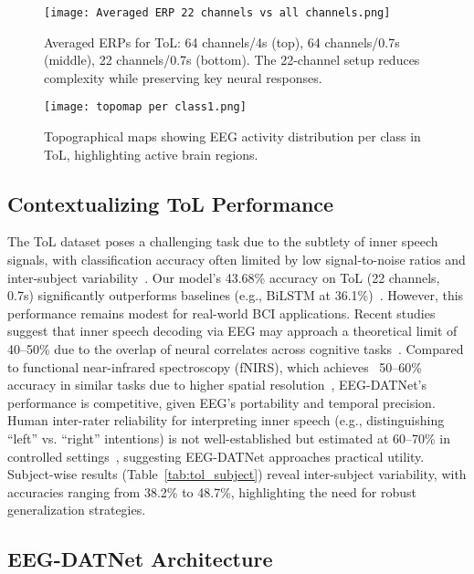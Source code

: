 \documentclass[pdflatex,sn-mathphys-num]{sn-jnl}%
\theoremstyle{thmstyleone}
\theoremstyle{thmstyletwo}
\theoremstyle{thmstylethree}
\begin{document}
\begin{figure}[H]
    \centering
    \texttt{[image: Averaged ERP 22 channels vs all channels.png]}
    \caption{Averaged ERPs for ToL: 64 channels/4s (top), 64 channels/0.7s (middle), 22 channels/0.7s (bottom). The 22-channel setup reduces complexity while preserving key neural responses.}
    \label{fig:Averaged ERP 22 channels vs all channels}
\end{figure}

\begin{figure}[H]
    \centering
    \texttt{[image: topomap per class1.png]}
    \caption{Topographical maps showing EEG activity distribution per class in ToL, highlighting active brain regions.}
    \label{fig:topomap per class}
\end{figure}

\subsection{Contextualizing ToL Performance}\label{subsec:context_tol}
The ToL dataset poses a challenging task due to the subtlety of inner speech signals, with classification accuracy often limited by low signal-to-noise ratios and inter-subject variability~\cite{nieto2022thinking}. Our model's 43.68\% accuracy on ToL (22 channels, 0.7s) significantly outperforms baselines (e.g., BiLSTM at 36.1\%)~\cite{Gasparini2022InnerSpeech}. However, this performance remains modest for real-world BCI applications. Recent studies suggest that inner speech decoding via EEG may approach a theoretical limit of 40–50\% due to the overlap of neural correlates across cognitive tasks~\cite{PerroneBertolotti2014}. Compared to functional near-infrared spectroscopy (fNIRS), which achieves ~50–60\% accuracy in similar tasks due to higher spatial resolution~\cite{herff2015}, EEG-DATNet’s performance is competitive, given EEG’s portability and temporal precision. Human inter-rater reliability for interpreting inner speech (e.g., distinguishing “left” vs. “right” intentions) is not well-established but estimated at 60–70\% in controlled settings~\cite{alderson2015}, suggesting EEG-DATNet approaches practical utility. Subject-wise results (Table~\ref{tab:tol_subject}) reveal inter-subject variability, with accuracies ranging from 38.2\% to 48.7\%, highlighting the need for robust generalization strategies.

\subsection{EEG-DATNet Architecture}
\end{document}
